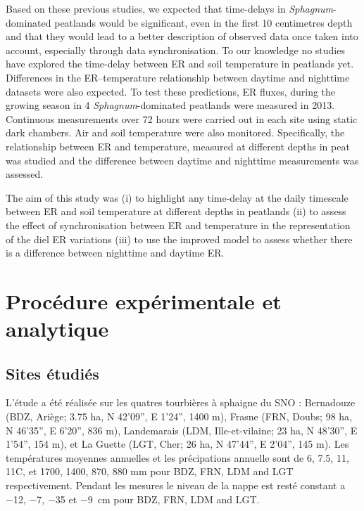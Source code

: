 Based on these previous studies, we expected that time-delays in \textit{Sphagnum}-dominated peatlands would be significant, even in the first 10 centimetres depth and that they would lead to a better description of observed data once taken into account, especially through data synchronisation.
To our knowledge no studies have explored the time-delay between ER and soil temperature in peatlands yet.
Differences in the ER--temperature relationship between daytime and nighttime datasets were also expected.
To test these predictions, ER fluxes, during the growing season in 4 \textit{Sphagnum}-dominated peatlands were measured in 2013.
Continuous measurements over 72 hours were carried out in each site using static dark chambers.
Air and soil temperature were also monitored.
Specifically, the relationship between ER and temperature, measured at different depths in peat was studied and the difference between daytime and nighttime measurements was assessed.

The aim of this study was (i) to highlight any time-delay at the daily timescale between ER and soil temperature at different depths in peatlands (ii) to assess the effect of synchronisation between ER and temperature in the representation of the diel ER variations (iii) to use the improved model to assess whether there is a difference between nighttime and daytime ER.

\section{Procédure expérimentale et analytique}

\subsection{Sites étudiés}
L'étude a été réalisée sur les quatres tourbières à sphaigne du SNO :
Bernadouze (BDZ, Ari\`ege; 3.75 ha, N 42’09”, E 1’24”, 1400 m), Frasne (FRN, Doubs; 98 ha, N 46’35”, E 6’20”, 836 m), Landemarais (LDM, Ille-et-vilaine; 23 ha, N 48’30”, E 1’54”, 154 m), et La Guette (LGT, Cher; 26 ha, N 47’44”, E 2’04”, 145 m).
Les températures moyennes annuelles et les précipations annuelle sont de 6, 7.5, 11, 11\textdegree C, et 1700, 1400, 870, 880 mm pour BDZ, FRN, LDM and LGT respectivement.
Pendant les mesures le niveau de la nappe est resté constant a \num{-12}, \num{-7}, \num{-35} et \SI{-9}{\centi\meter} pour BDZ, FRN, LDM and LGT.

